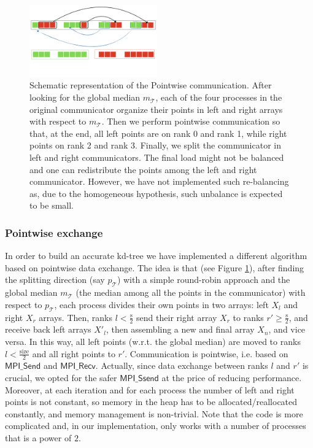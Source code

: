 \documentclass[amssymb, aps,nofootinbib, superscriptaddress, notitlepage]{revtex4}
\begin{document}
\begin{figure}
  \centering
      \includegraphics[width=0.49\textwidth]{img/point2point.png}
 \caption{Schematic representation of the Pointwise communication. After looking for the global median $m_\mathcal{T}$, each of the four processes in the original communicator organize their points in left and right arrays with respect to $m_\mathcal{T}$. Then  we perform pointwise communication so that, at the end, all left points are on rank 0 and rank 1, while right points on rank 2 and rank 3.  Finally, we split the communicator in left and right communicators.
The final load might not be balanced and one can redistribute the points among the left  and right communicator. However, we have not implemented such re-balancing as, due to the homogeneous hypothesis, such unbalance is expected to be small.}
\label{point2point}
\end{figure}



\subsubsection{Pointwise exchange}
In order to build an accurate kd-tree we have  implemented a different algorithm based on pointwise data exchange.
The idea is that (see Figure \ref{point2point}), after finding the  splitting direction (say $p_\mathcal{T}$) with a simple round-robin approach and the global median $m_\mathcal{T}$ (the median among all the points in the communicator) with respect to $p_\mathcal{T}$, each process divides their own points in two arrays: left $X_l$ and right $X_r$ arrays.
Then, ranks $l<\frac{\text{s}}{2}$  send their right array $X_r$  to ranks $r'\ge \frac{\text{s}}{2}$, and receive back left arrays $X'_l$, then assembling a new and final array $X_n$, and vice versa. In this way, all left points (w.r.t. the global median) are moved to ranks $l<\frac{\text{size}}{2}$  and all right points to $r'$. 
Communication is pointwise, i.e. based on  $\textsf{MPI\_Send}$ and $\textsf{MPI\_Recv}$.
Actually, since data exchange between ranks $l$  and  $r'$ is crucial, we opted for the safer $\textsf{MPI\_Ssend}$ at the price of  reducing  performance.  
Moreover, at each iteration and for each process the number of left and right points is not constant, so memory in the heap has to be allocated/reallocated constantly, and memory management is non-trivial.
Note that the code is more complicated and, in our implementation, only works  with a number of processes that is a power of $2$.
\end{document}
